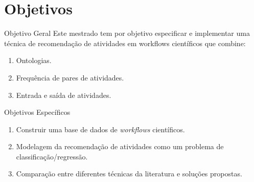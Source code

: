 \section{Objetivos}
	\begin{frame}
		\begin{block}{Objetivo Geral}
			Este mestrado tem por objetivo especificar e implementar uma técnica de recomendação de atividades em workflows científicos que combine: 
				\begin{enumerate}
					\item Ontologias.
					\item Frequência de pares de atividades.
					\item Entrada e saída de atividades.
				\end{enumerate}
		\end{block}
	\end{frame}

\begin{frame}
	\begin{block}{Objetivos Específicos}
		\begin{enumerate}
			\item Construir uma base de dados de \emph{workflows} científicos.
			\item Modelagem da recomendação de atividades como um problema de classificação/regressão.
			\item Comparação entre diferentes técnicas da literatura e soluções propostas.
		\end{enumerate}
	\end{block}
\end{frame}